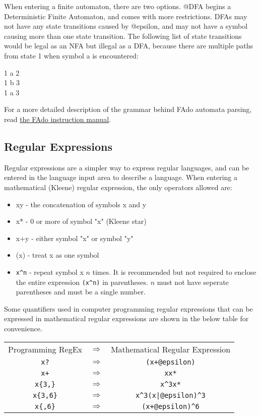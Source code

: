 \documentclass{article}
\begin{document}
\par When entering a finite automaton, there are two options.
@DFA begins a Deterministic Finite Automaton, and comes with more restrictions.
DFAs may not have any state transitions caused by @epsilon, and may not have a symbol causing more than one state transition.
The following list of state transitions would be legal as an NFA but illegal as a DFA, because there are multiple paths from state 1 when symbol a is encountered:
\begin{center}
1 a 2\\
1 b 3\\
1 a 3\\
\end{center}

\par For a more detailed description of the grammar behind FAdo automata parsing, read \href{https://www.dcc.fc.up.pt/~rvr/FAdo.pdf}{the FAdo instruction manual}.\cite{FAdoManual}

\subsection{Regular Expressions}
Regular expressions are a simpler way to express regular languages, and can be entered in the language input area to describe a language.
When entering a mathematical (Kleene) regular expression, the only operators allowed are:
\begin{itemize}
\item xy - the concatenation of symbols x and y
\item x* - 0 or more of symbol "x" (Kleene star)
\item x+y - either symbol "x" or symbol "y"
\item (x) - treat x as one symbol
\item \verb-x^n- - repeat symbol x $n$ times. It is recommended but not required to enclose the entire expression \verb-(x^n)- in parentheses. $n$ must not have seperate parentheses and must be a single number. 
\end{itemize}

\par Some quantifiers used in computer programming regular expressions that can be expressed in mathematical regular expressions are shown in the below table for convenience.
\begin{center}
\begin{tabular}{c c c}
Programming RegEx & $\Rightarrow$ & Mathematical Regular Expression \\
\verb-x?- & $\Rightarrow$ & \verb-(x+@epsilon)-\\
\verb-x+- & $\Rightarrow$ & \verb-xx*- \\
\verb-x{3,}- & $\Rightarrow$ & \verb-x^3x*- \\
\verb-x{3,6}- & $\Rightarrow$ & \verb-x^3(x|@epsilon)^3- \\
\verb-x{,6}- & $\Rightarrow$ & \verb-(x+@epsilon)^6- \\
\end{tabular}
\end{center}
\end{document}
